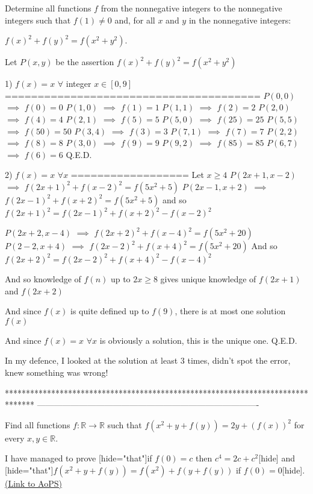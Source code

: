 \begin{solution}
	\begin{tcolorbox}Determine all functions $f$ from the nonnegative integers to the nonnegative integers such that $f(1)\neq0$ and, for all $x$ and $y$ in the nonnegative integers:

$f(x)^2+f(y)^2=f(x^2+y^2)$.\end{tcolorbox}
Let $P(x,y)$ be the assertion $f(x)^2+f(y)^2=f(x^2+y^2)$

1) $f(x)=x$ $\forall $ integer $x\in[0,9]$
=======================================
$P(0,0)$ $\implies$ $f(0)=0$
$P(1,0)$ $\implies$ $f(1)=1$
$P(1,1)$ $\implies$ $f(2)=2$
$P(2,0)$ $\implies$ $f(4)=4$
$P(2,1)$ $\implies$ $f(5)=5$
$P(5,0)$ $\implies$ $f(25)=25$
$P(5,5)$ $\implies$ $f(50)=50$
$P(3,4)$ $\implies$ $f(3)=3$
$P(7,1)$ $\implies$ $f(7)=7$
$P(2,2)$ $\implies$ $f(8)=8$
$P(3,0)$ $\implies$ $f(9)=9$
$P(9,2)$ $\implies$ $f(85)=85$
$P(6,7)$ $\implies$ $f(6)=6$
Q.E.D.

2) $f(x)=x$ $\forall x$
==================
Let $x\ge 4$
$P(2x+1,x-2)$ $\implies$ $f(2x+1)^2+f(x-2)^2=f(5x^2+5)$
$P(2x-1,x+2)$ $\implies$ $f(2x-1)^2+f(x+2)^2=f(5x^2+5)$
and so $f(2x+1)^2=f(2x-1)^2+f(x+2)^2-f(x-2)^2$

$P(2x+2,x-4)$ $\implies$ $f(2x+2)^2+f(x-4)^2=f(5x^2+20)$
$P(2-2,x+4)$ $\implies$ $f(2x-2)^2+f(x+4)^2=f(5x^2+20)$
And so $f(2x+2)^2=f(2x-2)^2+f(x+4)^2-f(x-4)^2$

And so knowledge of $f(n)$ up to $2x\ge 8$ gives unique knowledge of $f(2x+1)$ and $f(2x+2)$

And since $f(x)$ is quite defined up to $f(9)$, there is at most one solution $f(x)$

And since $f(x)=x$ $\forall x$ is obviously a solution, this is the unique one.
Q.E.D.
\end{solution}



\begin{solution}
	In my defence, I looked at the solution at least 3 times, didn't spot the error, knew something was wrong!
\end{solution}
*******************************************************************************
-------------------------------------------------------------------------------

\begin{problem}
	Find all functions $f: \mathbb{R} \rightarrow \mathbb{R}$ such that $f(x^2 + y + f(y)) = 2y + (f(x))^2$ for every $x, y \in \mathbb{R}$.

I have managed to prove [hide="that"]if $f(0) = c$ then $c^4 = 2c + c^2$[\/hide] and [hide="that"]$f(x^2 + y + f(y)) = f(x^2) + f(y + f(y))$ if $f(0) = 0$[\/hide].
	\flushright \href{https://artofproblemsolving.com/community/c6h405715}{(Link to AoPS)}
\end{problem}




